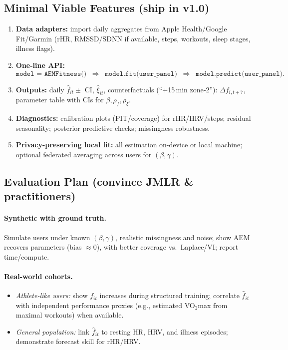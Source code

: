 \subsection*{Minimal Viable Features (ship in v1.0)}
\begin{enumerate}
\item \textbf{Data adapters:} import daily aggregates from Apple Health/Google Fit/Garmin (rHR, RMSSD/SDNN if available, steps, workouts, sleep stages, illness flags).
\item \textbf{One-line API:}
\[
\texttt{model = AEMFitness()} \;\;\Rightarrow\;\; \texttt{model.fit(user\_panel)} \;\;\Rightarrow\;\; 
\texttt{model.predict(user\_panel)}.
\]
\item \textbf{Outputs:} 
daily \(\widehat{f}_{it}\pm\) CI, \(\widehat{\xi}_{it}\), counterfactuals (``+15\,min zone‑2''): \(\Delta f_{i,t+7}\), parameter table with CIs for \(\beta,\rho_f,\rho_\xi\).
\item \textbf{Diagnostics:} calibration plots (PIT/coverage) for rHR/HRV/steps; residual seasonality; posterior predictive checks; missingness robustness.
\item \textbf{Privacy-preserving local fit:} all estimation on-device or local machine; optional federated averaging across users for \((\beta,\gamma)\).
\end{enumerate}

\subsection*{Evaluation Plan (convince JMLR \& practitioners)}
\paragraph{Synthetic with ground truth.}
Simulate users under known \((\beta,\gamma)\), realistic missingness and noise; show AEM recovers parameters (bias \(\approx 0\)), with better coverage vs.\ Laplace/VI; report time/compute.

\paragraph{Real-world cohorts.}
\begin{itemize}
\item \emph{Athlete-like users:} show \(f_{it}\) increases during structured training; correlate \(\widehat f_{it}\) with independent performance proxies (e.g., estimated VO\(_2\)max from maximal workouts) when available.
\item \emph{General population:} link \(\widehat f_{it}\) to resting HR, HRV, and illness episodes; demonstrate forecast skill for rHR/HRV.
\end{itemize}

